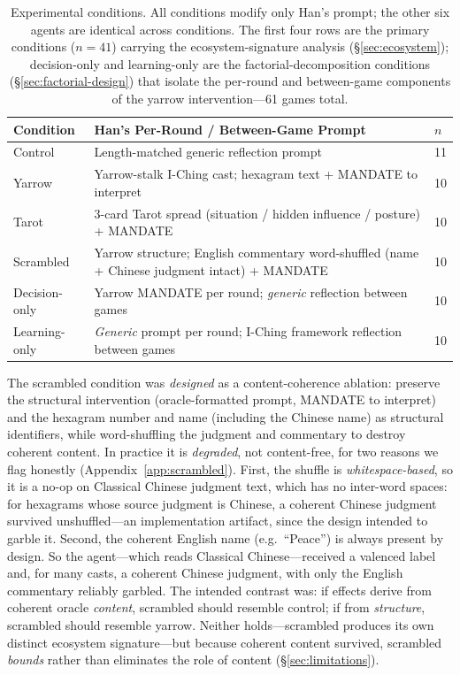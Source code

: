 \documentclass[11pt]{article}
\begin{document}
\begin{table}[h]
\centering
\caption{Experimental conditions. All conditions modify only Han's prompt; the other six agents are identical across conditions. The first four rows are the primary conditions ($n=41$) carrying the ecosystem-signature analysis (\S\ref{sec:ecosystem}); decision-only and learning-only are the factorial-decomposition conditions (\S\ref{sec:factorial-design}) that isolate the per-round and between-game components of the yarrow intervention---61 games total.}
\label{tab:conditions}
\begin{tabular}{lp{7.0cm}l}
\toprule
Condition & Han's Per-Round / Between-Game Prompt & $n$ \\
\midrule
Control & Length-matched generic reflection prompt & 11 \\
Yarrow & Yarrow-stalk I-Ching cast; hexagram text + \textsc{MANDATE} to interpret & 10 \\
Tarot & 3-card Tarot spread (situation / hidden influence / posture) + \textsc{MANDATE} & 10 \\
Scrambled & Yarrow structure; English commentary word-shuffled (name + Chinese judgment intact) + \textsc{MANDATE} & 10 \\
Decision-only & Yarrow \textsc{MANDATE} per round; \emph{generic} reflection between games & 10 \\
Learning-only & \emph{Generic} prompt per round; I-Ching framework reflection between games & 10 \\
\bottomrule
\end{tabular}
\end{table}

The scrambled condition was \emph{designed} as a content-coherence ablation: preserve the structural intervention (oracle-formatted prompt, \textsc{MANDATE} to interpret) and the hexagram number and name (including the Chinese name) as structural identifiers, while word-shuffling the judgment and commentary to destroy coherent content. In practice it is \emph{degraded}, not content-free, for two reasons we flag honestly (Appendix~\ref{app:scrambled}). First, the shuffle is \emph{whitespace-based}, so it is a no-op on Classical Chinese judgment text, which has no inter-word spaces: for hexagrams whose source judgment is Chinese, a coherent Chinese judgment survived unshuffled---an implementation artifact, since the design intended to garble it. Second, the coherent English name (e.g.\ ``Peace'') is always present by design. So the agent---which reads Classical Chinese---received a valenced label and, for many casts, a coherent Chinese judgment, with only the English commentary reliably garbled. The intended contrast was: if effects derive from coherent oracle \emph{content}, scrambled should resemble control; if from \emph{structure}, scrambled should resemble yarrow. Neither holds---scrambled produces its own distinct ecosystem signature---but because coherent content survived, scrambled \emph{bounds} rather than eliminates the role of content (\S\ref{sec:limitations}).
\end{document}
